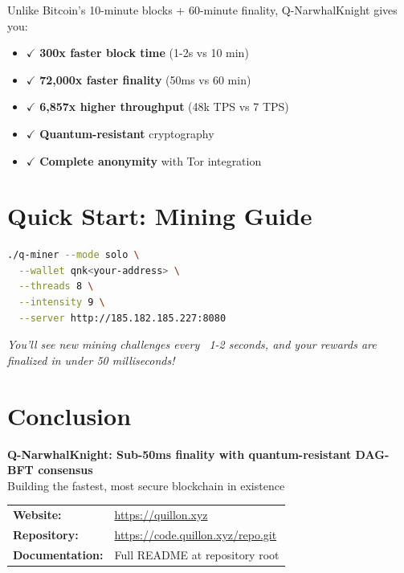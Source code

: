 \documentclass[12pt,a4paper]{article}
\begin{document}
Unlike Bitcoin's 10-minute blocks + 60-minute finality, Q-NarwhalKnight gives you:

\begin{itemize}
    \item $\checkmark$ \textbf{300x faster block time} (1-2s vs 10 min)
    \item $\checkmark$ \textcolor{quantumgreen}{\textbf{72,000x faster finality}} (50ms vs 60 min)
    \item $\checkmark$ \textbf{6,857x higher throughput} (48k TPS vs 7 TPS)
    \item $\checkmark$ \textbf{Quantum-resistant} cryptography
    \item $\checkmark$ \textbf{Complete anonymity} with Tor integration
\end{itemize}

\section{Quick Start: Mining Guide}

\begin{lstlisting}[language=bash,basicstyle=\ttfamily\small,
    backgroundcolor=\color{gray!10},frame=single]
./q-miner --mode solo \
  --wallet qnk<your-address> \
  --threads 8 \
  --intensity 9 \
  --server http://185.182.185.227:8080
\end{lstlisting}

\vspace{0.5cm}
\begin{center}
\textit{You'll see new mining challenges every ~1-2 seconds, and your rewards are finalized in under 50 milliseconds!}
\end{center}

\section{Conclusion}

\begin{center}
\colorbox{quantumcyan!20}{\parbox{0.9\textwidth}{\centering\Large
\textbf{Q-NarwhalKnight: Sub-50ms finality with quantum-resistant DAG-BFT consensus}\\[0.3cm]
\large Building the fastest, most secure blockchain in existence}}
\end{center}

\vspace{1cm}

\begin{center}
\begin{tabular}{ll}
\textbf{Website:} & \url{https://quillon.xyz} \\
\textbf{Repository:} & \url{https://code.quillon.xyz/repo.git} \\
\textbf{Documentation:} & Full README at repository root \\
\end{tabular}
\end{center}
\end{document}
